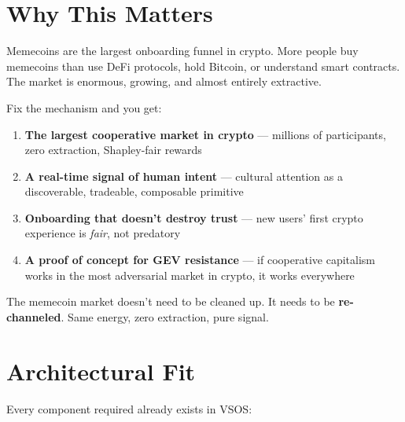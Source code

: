 \documentclass[9pt, letterpaper]{article}
\begin{document}

\section{Why This Matters}

Memecoins are the largest onboarding funnel in crypto. More people buy memecoins than use DeFi protocols, hold Bitcoin, or understand smart contracts. The market is enormous, growing, and almost entirely extractive.

Fix the mechanism and you get:

\begin{enumerate}
\item \textbf{The largest cooperative market in crypto} --- millions of participants, zero extraction, Shapley-fair rewards
\item \textbf{A real-time signal of human intent} --- cultural attention as a discoverable, tradeable, composable primitive
\item \textbf{Onboarding that doesn't destroy trust} --- new users' first crypto experience is \textit{fair}, not predatory
\item \textbf{A proof of concept for GEV resistance} --- if cooperative capitalism works in the most adversarial market in crypto, it works everywhere
\end{enumerate}

The memecoin market doesn't need to be cleaned up. It needs to be \textbf{re-channeled}. Same energy, zero extraction, pure signal.


\section{Architectural Fit}

Every component required already exists in VSOS:
\end{document}
